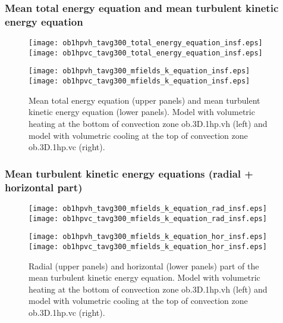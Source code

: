 \documentclass[10pt,paper=a4]{report}
\begin{document}
\newpage

\subsubsection{Mean total energy equation and mean turbulent kinetic energy equation}

\begin{figure}[!h]
\centerline{
\texttt{[image: ob1hpvh\_tavg300\_total\_energy\_equation\_insf.eps]}
\texttt{[image: ob1hpvc\_tavg300\_total\_energy\_equation\_insf.eps]}}

\centerline{
\texttt{[image: ob1hpvh\_tavg300\_mfields\_k\_equation\_insf.eps]}
\texttt{[image: ob1hpvc\_tavg300\_mfields\_k\_equation\_insf.eps]}}
\caption{Mean total energy equation (upper panels) and mean turbulent kinetic energy equation (lower panels). Model with volumetric heating at the bottom of convection zone {\sf ob.3D.1hp.vh} (left) and model with volumetric cooling at the top of convection zone {\sf ob.3D.1hp.vc} (right).}
\end{figure}

\newpage






\newpage

\subsubsection{Mean turbulent kinetic energy equations (radial + horizontal part)}

\begin{figure}[!h]
\centerline{
\texttt{[image: ob1hpvh\_tavg300\_mfields\_k\_equation\_rad\_insf.eps]}
\texttt{[image: ob1hpvc\_tavg300\_mfields\_k\_equation\_rad\_insf.eps]}}

\centerline{
\texttt{[image: ob1hpvh\_tavg300\_mfields\_k\_equation\_hor\_insf.eps]}
\texttt{[image: ob1hpvc\_tavg300\_mfields\_k\_equation\_hor\_insf.eps]}}
\caption{Radial (upper panels) and horizontal (lower panels) part of the mean turbulent kinetic energy equation. Model with volumetric heating at the bottom of convection zone {\sf ob.3D.1hp.vh} (left) and model with volumetric cooling at the top of convection zone {\sf ob.3D.1hp.vc} (right).}
\end{figure}
\end{document}
